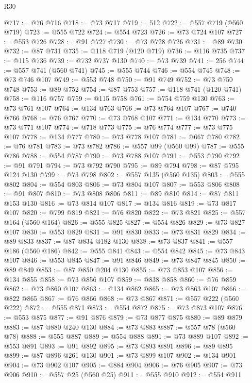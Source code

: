 \begin{lexlean}{R30}
\begin{coremodule}
{{{{{@717 := @76 @716
@718 := @73 @717
@719 := 512
@722 := @557 @719 (@560 @719)
@723 := @555 @722
@724 := @554 @723
@726 := @73 @724 @107
@727 := @553 @726
@728 := @91 @727
@730 := @73 @728 @726
@731 := @89 @730
@732 := @87 @731
@735 := @118 @719 (@120 @719)
@736 := @116 @735
@737 := @115 @736
@739 := @732 @737 @130
@740 := @73 @739
@741 := 256
@744 := @557 @741 (@560 @741)
@745 := @555 @744
@746 := @554 @745
@748 := @73 @746 @107
@749 := @553 @748
@750 := @91 @749
@752 := @73 @750 @748
@753 := @89 @752
@754 := @87 @753
@757 := @118 @741 (@120 @741)
@758 := @116 @757
@759 := @115 @758
@761 := @754 @759 @130
@763 := @73 @761 @107
@764 := @134 @763
@766 := @73 @764 @107
@767 := @740 @766
@768 := @76 @767
@770 := @73 @768 @107
@771 := @134 @770
@773 := @73 @771 @107
@774 := @718 @773
@775 := @76 @774
@777 := @73 @775 @107
@778 := @134 @777
@780 := @73 @778 @107
@781 := @667 @780
@782 := @76 @781
@783 := @73 @782
@786 := @557 @99 (@560 @99)
@787 := @555 @786
@788 := @554 @787
@790 := @73 @788 @107
@791 := @553 @790
@792 := @91 @791
@794 := @73 @792 @790
@795 := @89 @794
@798 := @87 @795 @124 @130
@799 := @73 @798
@802 := @557 @135 (@560 @135)
@803 := @555 @802
@804 := @554 @803
@806 := @73 @804 @107
@807 := @553 @806
@808 := @91 @807
@810 := @73 @808 @806
@811 := @89 @810
@814 := @87 @811 @153 @130
@816 := @73 @814 @107
@817 := @134 @816
@819 := @73 @817 @107
@820 := @799 @819
@821 := @76 @820
@822 := @73 @821
@825 := @557 @164 (@560 @164)
@826 := @555 @825
@827 := @554 @826
@829 := @73 @827 @107
@830 := @553 @829
@831 := @91 @830
@833 := @73 @831 @829
@834 := @89 @833
@837 := @87 @834 @182 @130
@838 := @73 @837
@841 := @557 @186 (@560 @186)
@842 := @555 @841
@843 := @554 @842
@845 := @73 @843 @107
@846 := @553 @845
@847 := @91 @846
@849 := @73 @847 @845
@850 := @89 @849
@853 := @87 @850 @204 @130
@855 := @73 @853 @107
@856 := @134 @855
@858 := @73 @856 @107
@859 := @838 @858
@860 := @76 @859
@862 := @73 @860 @107
@863 := @134 @862
@865 := @73 @863 @107
@866 := @822 @865
@867 := @76 @866
@868 := @73 @867
@871 := @557 @222 (@560 @222)
@872 := @555 @871
@873 := @554 @872
@875 := @73 @873 @107
@876 := @553 @875
@877 := @91 @876
@879 := @73 @877 @875
@880 := @89 @879
@883 := @87 @880 @240 @130
@884 := @73 @883
@887 := @557 @78 (@560 @78)
@888 := @555 @887
@889 := @554 @888
@891 := @73 @889 @107
@892 := @553 @891
@893 := @91 @892
@895 := @73 @893 @891
@896 := @89 @895
@899 := @87 @896 @261 @130
@901 := @73 @899 @107
@902 := @134 @901
@904 := @73 @902 @107
@905 := @884 @904
@906 := @76 @905
@907 := @73 @906
@910 := @557 @25 (@560 @25)
@911 := @555 @910
@912 := @554 @911
}}}}}
\end{coremodule}
\end{lexlean}
